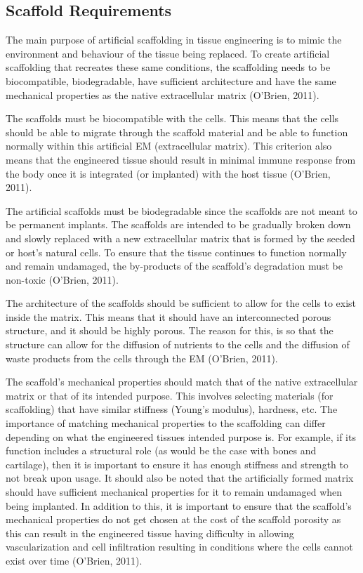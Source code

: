 \subsection{Scaffold Requirements}
The main purpose of artificial scaffolding in tissue engineering is to mimic the environment and behaviour of the tissue being replaced. To create artificial scaffolding that recreates these same conditions, the scaffolding needs to be biocompatible, biodegradable, have sufficient architecture and have the same mechanical properties as the native extracellular matrix (O’Brien, 2011).

The scaffolds must be biocompatible with the cells. This means that the cells should be able to migrate through the scaffold material and be able to function normally within this artificial EM (extracellular matrix). This criterion also means that the engineered tissue should result in minimal immune response from the body once it is integrated (or implanted) with the host tissue (O’Brien, 2011).

The artificial scaffolds must be biodegradable since the scaffolds are not meant to be permanent implants. The scaffolds are intended to be gradually broken down and slowly replaced with a new extracellular matrix that is formed by the seeded or host’s natural cells. To ensure that the tissue continues to function normally and remain undamaged, the by-products of the scaffold’s degradation must be non-toxic (O’Brien, 2011).

The architecture of the scaffolds should be sufficient to allow for the cells to exist inside the matrix. This means that it should have an interconnected porous structure, and it should be highly porous. The reason for this, is so that the structure can allow for the diffusion of nutrients to the cells and the diffusion of waste products from the cells through the EM (O’Brien, 2011).

The scaffold’s mechanical properties should match that of the native extracellular matrix or that of its intended purpose. This involves selecting materials (for scaffolding) that have similar stiffness (Young’s modulus), hardness, etc. The importance of matching mechanical properties to the scaffolding can differ depending on what the engineered tissues intended purpose is. For example, if its function includes a structural role (as would be the case with bones and cartilage), then it is important to ensure it has enough stiffness and strength to not break upon usage. It should also be noted that the artificially formed matrix should have sufficient mechanical properties for it to remain undamaged when being implanted. In addition to this, it is important to ensure that the scaffold’s mechanical properties do not get chosen at the cost of the scaffold porosity as this can result in the engineered tissue having difficulty in allowing vascularization and cell infiltration resulting in conditions where the cells cannot exist over time (O’Brien, 2011).

